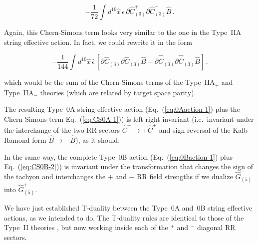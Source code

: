 \documentclass[12pt,a4paper]{article}
\begin{document}
\begin{equation}
\label{eq:CS0A-1}
-{\textstyle\frac{1}{72}} \int d^{10}\hat{x}\, 
\hat{\epsilon}\,
\partial\hat{C}^{+}_{(3)}\partial\hat{C}^{-}_{(3)}\hat{B}\, .
\end{equation}

\noindent Again, this Chern-Simons term looks very similar to the one in the
Type~IIA string effective action. In fact, we could rewrite it in the
form

\begin{equation}
\label{eq:CS0A-2}
-{\textstyle\frac{1}{144}} \int d^{10}\hat{x}\, 
\hat{\epsilon}\,\left[
\partial\hat{C}_{(3)}\partial\hat{C}_{(3)}\hat{B}
-\partial\hat{\overline{C}}_{(3)}\partial\hat{\overline{C}}_{(3)}\hat{B}
\right]\, .
\end{equation}

\noindent which would be the sum of the Chern-Simons terms of the 
Type~IIA$_{+}$ and Type~IIA$_{-}$ theories (which are related
by target space parity).  

The resulting Type~0A string effective action
(Eq.~(\ref{eq:0Aaction-1}) plus the Chern-Simons term
Eq.~(\ref{eq:CS0A-1})) is left-right invariant (i.e.~invariant under
the interchange of the two RR sectors $\hat{C}^{\pm}\rightarrow \pm
\hat{C}^{\pm}$ and sign reversal of the Kalb-Ramond form $\hat{B}
\rightarrow -\hat{B}$), as it should.

In the same way, the complete Type~0B action
(Eq.~(\ref{eq:0Baction-1}) plus Eq.~(\ref{eq:CS0B-2})) is invariant
under the transformation that changes the sign of the tachyon and
interchanges the $+$ and $-$ RR field strengths if we dualize
$\hat{G}^{-}_{(5)}$ into $\hat{G}^{+}_{(5)}$.

We have just established T-duality between the Type~0A and~0B string
effective actions, as we intended to do. The T-duality rules are
identical to those of the Type~II theories \cite{kn:MO}, but now
working inside each of the ${}^{+}$ and ${}^{-}$ diagonal RR sectors.


\end{document}
